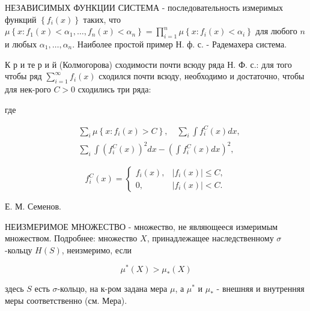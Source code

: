 \documentclass[10pt]{article}
\begin{document}
НЕЗАВИСИМЫХ ФУНКЦИИ СИСТЕМА - последовательность измеримых функций $\left\{f_{i}(x)\right\}$ таких, что $\mu\left\{x: f_{1}(x)<\alpha_{1}, \ldots, f_{n}(x)<\alpha_{n}\right\}=\prod_{i=1}^{n} \mu\left\{x: f_{i}(x)<\alpha_{i}\right\}$ для любого $n$ и любых $\alpha_{1}, \ldots, \alpha_{n}$. Наиболее простой пример Н. ф. с. - Радемахера система.



К р и те р и й (Колмогорова) сходимости почти всюду ряда Н. Ф. с.: для того чтобы ряд $\sum_{i=1}^{\infty} f_{i}(x)$ сходился почти всюду, необходимо и достаточно, чтобы для нек-рого $C>0$ сходились три ряда:



где



\[

\begin{aligned}

& \sum_{i} \mu\left\{x: f_{i}(x)>C\right\}, \quad \sum_{i} \int f_{i}^{C}(x) d x, \\

& \sum_{i} \int\left(f_{i}^{C}(x)\right)^{2} d x-\left(\int f_{i}^{C}(x) d x\right)^{2},

\end{aligned}

\]



\[

f_{i}^{C}(x)=\left\{\begin{array}{cc}

f_{i}(x), & \left|f_{i}(x)\right| \leqslant C, \\

0, & \left|f_{i}(x)\right|<C .

\end{array}\right.

\]



Е. М. Семенов.



НЕИЗМЕРИМОЕ МНОЖЕСТВО - множество, не являющееся измеримым множеством. Подробнее: множество $X$, принадлежащее наследственному $\sigma$-кольцу $H(S)$, неизмеримо, если



\[

\mu^{*}(X)>\mu_{*}(X)

\]



здесь $S$ есть $\sigma$-кольцо, на к-ром задана мера $\mu$, а $\mu^{*}$ и $\mu_{*}$ - внешняя и внутренняя меры соответственно (см. Мера).
\end{document}

